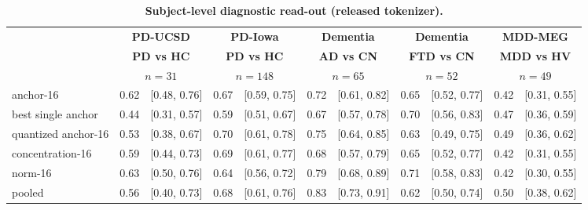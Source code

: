 \begin{table}[!ht]
\begin{adjustwidth}{-2.25in}{0in}
\renewcommand{\baselinestretch}{1}
\caption{{\bf Subject-level diagnostic read-out (released tokenizer).}}
\label{tab:readout}
\centering\small
\setlength{\tabcolsep}{5pt}
\begin{tabular}{@{}lr@{\hspace{6pt}}lr@{\hspace{6pt}}lr@{\hspace{6pt}}lr@{\hspace{6pt}}lr@{\hspace{6pt}}l@{}}
\toprule
& \multicolumn{2}{c}{\textbf{PD-UCSD}} & \multicolumn{2}{c}{\textbf{PD-Iowa}} & \multicolumn{2}{c}{\textbf{Dementia}} & \multicolumn{2}{c}{\textbf{Dementia}} & \multicolumn{2}{c}{\textbf{MDD-MEG}} \\
\cmidrule(lr){2-3}\cmidrule(lr){4-5}\cmidrule(lr){6-7}\cmidrule(lr){8-9}\cmidrule(lr){10-11}
& \multicolumn{2}{c}{\textbf{PD vs HC}} & \multicolumn{2}{c}{\textbf{PD vs HC}} & \multicolumn{2}{c}{\textbf{AD vs CN}} & \multicolumn{2}{c}{\textbf{FTD vs CN}} & \multicolumn{2}{c}{\textbf{MDD vs HV}} \\
& \multicolumn{2}{c}{$n=31$} & \multicolumn{2}{c}{$n=148$} & \multicolumn{2}{c}{$n=65$} & \multicolumn{2}{c}{$n=52$} & \multicolumn{2}{c}{$n=49$} \\
\midrule
anchor-16 & 0.62 & [0.48, 0.76] & 0.67\rlap{$^{*}$} & [0.59, 0.75] & 0.72\rlap{$^{*}$} & [0.61, 0.82] & 0.65 & [0.52, 0.77] & 0.42 & [0.31, 0.55] \\
best single anchor & 0.44 & [0.31, 0.57] & 0.59 & [0.51, 0.67] & 0.67\rlap{$^{*}$} & [0.57, 0.78] & 0.70\rlap{$^{*}$} & [0.56, 0.83] & 0.47 & [0.36, 0.59] \\
quantized anchor-16 & 0.53 & [0.38, 0.67] & 0.70\rlap{$^{*}$} & [0.61, 0.78] & 0.75\rlap{$^{*}$} & [0.64, 0.85] & 0.63\rlap{$^{*}$} & [0.49, 0.75] & 0.49 & [0.36, 0.62] \\
concentration-16 & 0.59 & [0.44, 0.73] & 0.69\rlap{$^{*}$} & [0.61, 0.77] & 0.68\rlap{$^{*}$} & [0.57, 0.79] & 0.65\rlap{$^{*}$} & [0.52, 0.77] & 0.42 & [0.31, 0.55] \\
norm-16 & 0.63 & [0.50, 0.76] & 0.64\rlap{$^{*}$} & [0.56, 0.72] & 0.79\rlap{$^{*}$} & [0.68, 0.89] & 0.71\rlap{$^{*}$} & [0.58, 0.83] & 0.42 & [0.30, 0.55] \\
pooled & 0.56 & [0.40, 0.73] & 0.68\rlap{$^{*}$} & [0.61, 0.76] & 0.83\rlap{$^{*}$} & [0.73, 0.91] & 0.62\rlap{$^{*}$} & [0.50, 0.74] & 0.50 & [0.38, 0.62] \\

\end{tabular}
\end{adjustwidth}
\end{table}

